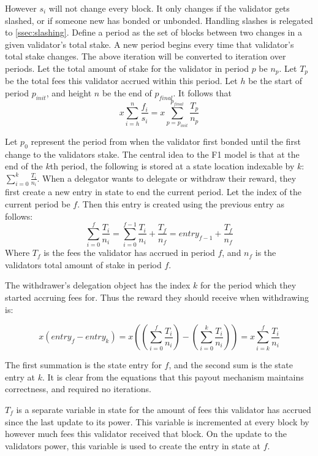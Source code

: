 \documentclass[]{article}
\begin{document}
However $s_i$ will not change every block.
It only changes if the validator gets slashed, or if someone new has bonded or unbonded.
Handling slashes is relegated to \autoref{ssec:slashing}.
Define a period as the set of blocks between two changes in a given validator's total stake.
A new period begins every time that validator's total stake changes.
The above iteration will be converted to iteration over periods.
Let the total amount of stake for the validator in period $p$ be $n_p$.
Let $T_p$ be the total fees this validator accrued within this period.
Let $h$ be the start of period $p_{init}$, and height $n$ be the end of $p_{final}$.
It follows that 
$$x \sum_{i = h}^{n} \frac{f_i}{s_i} = x \sum_{p = p_{init}}^{p_{final}} \frac{T_p}{n_p}$$

Let $p_0$ represent the period from when the validator first bonded until the first change to the validators stake.
The central idea to the F1 model is that at the end of the $k$th period, the following is stored at a state location indexable by $k$: $\sum_{i=0}^{k}\frac{T_i}{n_i}$.
When a delegator wants to delegate or withdraw their reward, they first create a new entry in state to end the current period. Let the index of the current period be $f$. 
Then this entry is created using the previous entry as follows: $$\sum_{i=0}^{f}\frac{T_i}{n_i} = \sum_{i=0}^{f-1}\frac{T_i}{n_i} + \frac{T_f}{n_f} = entry_{f-1} + \frac{T_f}{n_f}$$
Where $T_f$ is the fees the validator has accrued in period $f$, and $n_f$ is the validators total amount of stake in period $f$.

The withdrawer's delegation object has the index $k$ for the period which they started accruing fees for.
Thus the reward they should receive when withdrawing is:

$$x\left(entry_f - entry_k\right)  = x\left(\left(\sum_{i=0}^{f}\frac{T_i}{n_i}\right) - \left(\sum_{i=0}^{k}\frac{T_i}{n_i}\right)\right) = x \sum_{i = k}^{f} \frac{T_i}{n_i}$$

The first summation is the state entry for $f$, and the second sum is the state entry at $k$.
It is clear from the equations that this payout mechanism maintains correctness, and required no iterations.

$T_f$ is a separate variable in state for the amount of fees this validator has accrued since the last update to its power.
This variable is incremented at every block by however much fees this validator received that block.
On the update to the validators power, this variable is used to create the entry in state at $f$.
\end{document}
